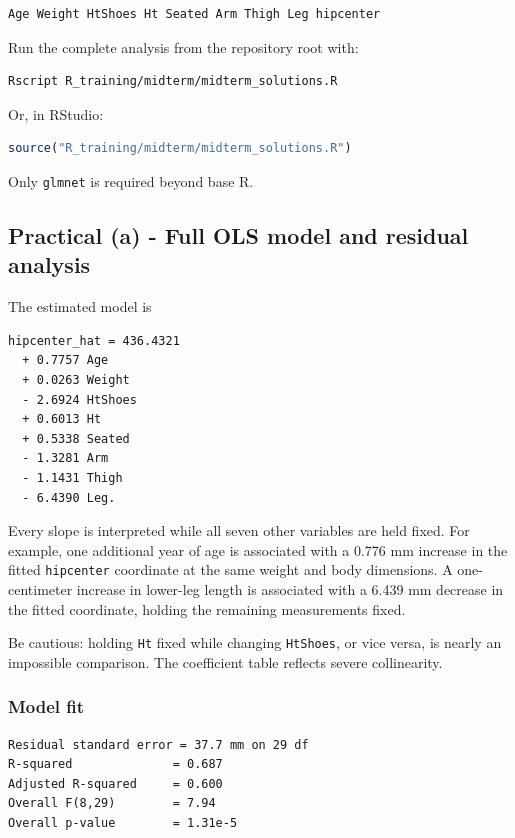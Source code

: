 ﻿\documentclass[11pt]{article}
\begin{document}
\begin{lstlisting}
Age Weight HtShoes Ht Seated Arm Thigh Leg hipcenter
\end{lstlisting}

Run the complete analysis from the repository root with:

\begin{lstlisting}[language={}]
Rscript R_training/midterm/midterm_solutions.R
\end{lstlisting}

Or, in RStudio:

\begin{lstlisting}[language=R]
source("R_training/midterm/midterm_solutions.R")
\end{lstlisting}

Only \texttt{glmnet} is required beyond base R.

\subsection{Practical (a) - Full OLS model and residual analysis}

The estimated model is

\begin{lstlisting}
hipcenter_hat = 436.4321
  + 0.7757 Age
  + 0.0263 Weight
  - 2.6924 HtShoes
  + 0.6013 Ht
  + 0.5338 Seated
  - 1.3281 Arm
  - 1.1431 Thigh
  - 6.4390 Leg.
\end{lstlisting}

Every slope is interpreted while all seven other variables are held fixed. For
example, one additional year of age is associated with a 0.776 mm increase in
the fitted \texttt{hipcenter} coordinate at the same weight and body dimensions. A
one-centimeter increase in lower-leg length is associated with a 6.439 mm
decrease in the fitted coordinate, holding the remaining measurements fixed.

Be cautious: holding \texttt{Ht} fixed while changing \texttt{HtShoes}, or vice versa, is nearly
an impossible comparison. The coefficient table reflects severe collinearity.

\subsubsection{Model fit}

\begin{lstlisting}
Residual standard error = 37.7 mm on 29 df
R-squared              = 0.687
Adjusted R-squared     = 0.600
Overall F(8,29)        = 7.94
Overall p-value        = 1.31e-5
\end{lstlisting}
\end{document}
